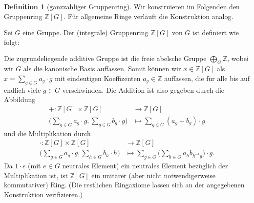 \documentclass[a4paper,twoside,10pt]{scrreprt}
\newcommand{\Z}{\mathbb{Z}}
\theoremstyle{definition}
\newtheorem{definition}[satz]{Definition}
\begin{document}
\begin{definition}[ganzzahliger Gruppenring]
Wir konstruieren im Folgenden den Gruppenring $\Z[G]$. Für allgemeine Ringe verläuft die Konstruktion analog.\par
Sei $G$ eine Gruppe. Der (integrale) Gruppenring $\Z[G]$ von $G$ ist definiert wie folgt:\par
Die zugrundeliegende additive Gruppe ist die freie abelsche Gruppe $\bigoplus\limits_G \Z$, wobei wir $G$ als die kanonische Basis auffassen. Somit können wir $x\in \Z[G]$ als $x=\sum\limits_{g\in G}a_g\cdot g$ mit eindeutigen Koeffizenten $a_g \in \Z$ auffassen, die für alle bis auf endlich viele $g\in G$ verschwinden. Die Addition ist also gegeben durch die Abbildung 
\begin{align*}
+:\Z[G]\times \Z[G] &\to \Z[G]\\
\biggl(\sum\limits_{g\in G}a_g\cdot g, \sum\limits_{g\in G}b_g\cdot g\biggr) &\mapsto\sum\limits_{g\in G}(a_g+b_g)\cdot g
\end{align*}
und die Multiplikation durch
\begin{align*}
\cdot :\Z[G]\times \Z[G] &\to \Z[G]\\
\biggl(\sum\limits_{g\in G}a_g\cdot g, \sum\limits_{h\in G}b_h\cdot h\biggr) &\mapsto\sum\limits_{g\in G}\biggl(\sum\limits_{h\in G}a_hb_{h^{-1}g}\biggr)\cdot g.
\end{align*}
Da $1\cdot e$ (mit $e\in G$ neutrales Element) ein neutrales Element bezüglich der Multiplikation ist, ist $\Z[G]$ ein unitärer (aber nicht notwendigerweise kommutativer) Ring. (Die restlichen Ringaxiome lassen sich an der angegebenen Konstruktion verifizieren.)
\end{definition}
\end{document}

